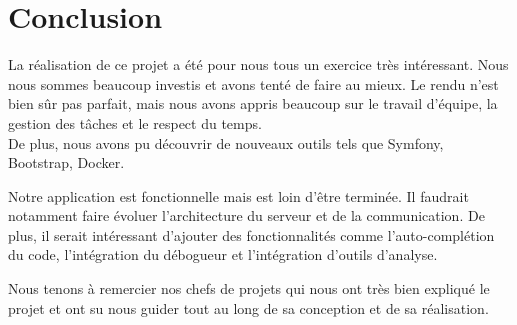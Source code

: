 \chapter{Conclusion}

\par La réalisation de ce projet a été pour nous tous un exercice très intéressant. Nous nous sommes beaucoup investis et avons tenté de faire au mieux. Le rendu n'est bien sûr pas parfait, mais nous avons appris beaucoup sur le travail d'équipe, la gestion des tâches et le respect du temps.\\
De plus, nous avons pu découvrir de nouveaux outils tels que Symfony, Bootstrap, Docker. \\

\par Notre application est fonctionnelle mais est loin d'être terminée. Il faudrait notamment faire évoluer l'architecture du serveur et de la communication. De plus, il serait intéressant d'ajouter des fonctionnalités comme l'auto-complétion du code, l’intégration du débogueur et l'intégration d’outils d’analyse. \\

\par Nous tenons à remercier nos chefs de projets qui nous ont très bien expliqué le projet et ont su nous guider tout au long de sa conception et de sa réalisation.